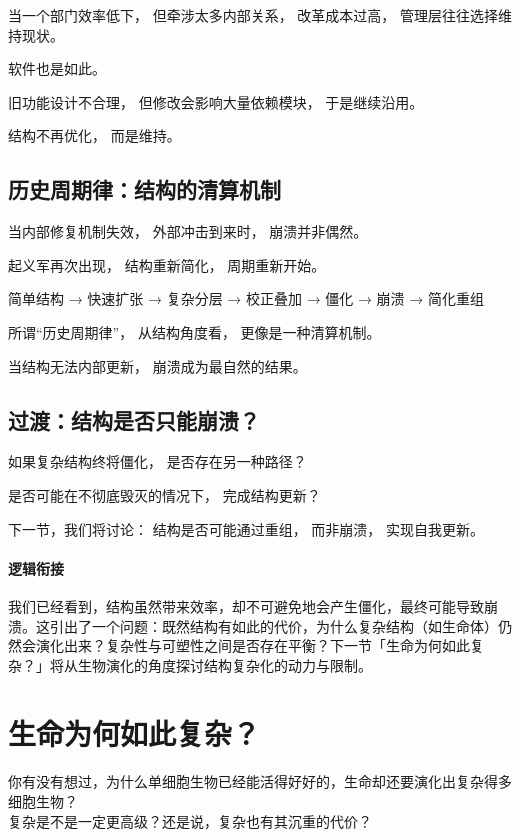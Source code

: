 \documentclass[openany, a4paper, 12pt]{book}
\begin{document}
当一个部门效率低下，
但牵涉太多内部关系，
改革成本过高，
管理层往往选择维持现状。

软件也是如此。

旧功能设计不合理，
但修改会影响大量依赖模块，
于是继续沿用。

结构不再优化，
而是维持。

\subsection{历史周期律：结构的清算机制}

当内部修复机制失效，
外部冲击到来时，
崩溃并非偶然。

起义军再次出现，
结构重新简化，
周期重新开始。

\begin{examplebox}
	简单结构 → 快速扩张 → 复杂分层 → 校正叠加 → 僵化 → 崩溃 → 简化重组
\end{examplebox}

所谓“历史周期律”，
从结构角度看，
更像是一种清算机制。

当结构无法内部更新，
崩溃成为最自然的结果。

\subsection{过渡：结构是否只能崩溃？}

如果复杂结构终将僵化，
是否存在另一种路径？

是否可能在不彻底毁灭的情况下，
完成结构更新？

下一节，我们将讨论：
结构是否可能通过重组，
而非崩溃，
实现自我更新。


\paragraph*{逻辑衔接}
我们已经看到，结构虽然带来效率，却不可避免地会产生僵化，最终可能导致崩溃。这引出了一个问题：既然结构有如此的代价，为什么复杂结构（如生命体）仍然会演化出来？复杂性与可塑性之间是否存在平衡？下一节「生命为何如此复杂？」将从生物演化的角度探讨结构复杂化的动力与限制。

\section{生命为何如此复杂？}
\label{sec:cases}

\begin{readingnote}
	你有没有想过，为什么单细胞生物已经能活得好好的，生命却还要演化出复杂得多细胞生物？\\
	复杂是不是一定更高级？还是说，复杂也有其沉重的代价？
\end{readingnote}
\end{document}
